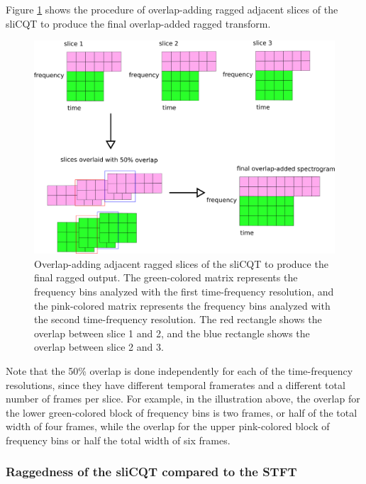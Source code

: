\documentclass[report.tex]{subfiles}
\begin{document}
Figure \ref{fig:raggedslicqtoverlapadd} shows the procedure of overlap-adding ragged adjacent slices of the sliCQT to produce the final overlap-added ragged transform.

\begin{figure}[ht]
	\centering
	\includegraphics[width=\textwidth]{./images-blockdiagrams/overlapprocess.png}
	\caption{Overlap-adding adjacent ragged slices of the sliCQT to produce the final ragged output. The green-colored matrix represents the frequency bins analyzed with the first time-frequency resolution, and the pink-colored matrix represents the frequency bins analyzed with the second time-frequency resolution. The red rectangle shows the overlap between slice 1 and 2, and the blue rectangle shows the overlap between slice 2 and 3.}
	\label{fig:raggedslicqtoverlapadd}
\end{figure}

Note that the 50\% overlap is done independently for each of the time-frequency resolutions, since they have different temporal framerates and a different total number of frames per slice. For example, in the illustration above, the overlap for the lower green-colored block of frequency bins is two frames, or half of the total width of four frames, while the overlap for the upper pink-colored block of frequency bins or half the total width of six frames.

\subsubsection{Raggedness of the sliCQT compared to the STFT}
\label{sec:stftslicqtcomp2}
\end{document}
